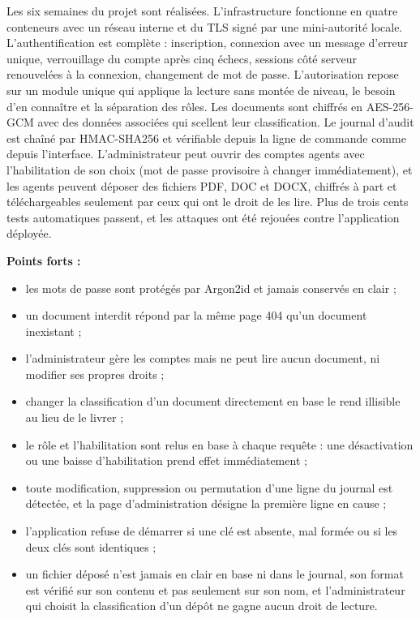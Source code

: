 \documentclass[12pt,a4paper]{report}
\begin{document}
Les six semaines du projet sont réalisées. L'infrastructure fonctionne en quatre conteneurs avec un réseau interne et du TLS signé par une mini-autorité locale. L'authentification est complète : inscription, connexion avec un message d'erreur unique, verrouillage du compte après cinq échecs, sessions côté serveur renouvelées à la connexion, changement de mot de passe. L'autorisation repose sur un module unique qui applique la lecture sans montée de niveau, le besoin d'en connaître et la séparation des rôles. Les documents sont chiffrés en AES-256-GCM avec des données associées qui scellent leur classification. Le journal d'audit est chaîné par HMAC-SHA256 et vérifiable depuis la ligne de commande comme depuis l'interface. L'administrateur peut ouvrir des comptes agents avec l'habilitation de son choix (mot de passe provisoire à changer immédiatement), et les agents peuvent déposer des fichiers PDF, DOC et DOCX, chiffrés à part et téléchargeables seulement par ceux qui ont le droit de les lire. Plus de trois cents tests automatiques passent, et les attaques ont été rejouées contre l'application déployée.

\textbf{Points forts :}
\begin{itemize}
  \item les mots de passe sont protégés par Argon2id et jamais conservés en clair ;
  \item un document interdit répond par la même page 404 qu'un document inexistant ;
  \item l'administrateur gère les comptes mais ne peut lire aucun document, ni modifier ses propres droits ;
  \item changer la classification d'un document directement en base le rend illisible au lieu de le livrer ;
  \item le rôle et l'habilitation sont relus en base à chaque requête : une désactivation ou une baisse d'habilitation prend effet immédiatement ;
  \item toute modification, suppression ou permutation d'une ligne du journal est détectée, et la page d'administration désigne la première ligne en cause ;
  \item l'application refuse de démarrer si une clé est absente, mal formée ou si les deux clés sont identiques ;
  \item un fichier déposé n'est jamais en clair en base ni dans le journal, son format est vérifié sur son contenu et pas seulement sur son nom, et l'administrateur qui choisit la classification d'un dépôt ne gagne aucun droit de lecture.
\end{itemize}
\end{document}
